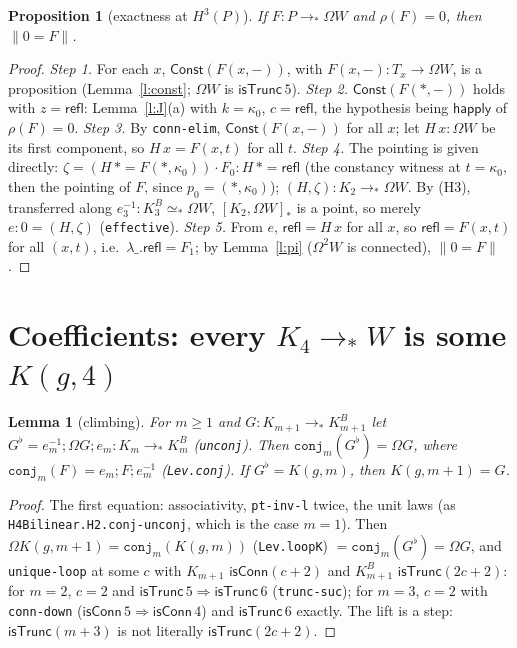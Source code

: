 \documentclass[11pt]{amsart}
\newtheorem{proposition}[theorem]{Proposition}
\newtheorem{lemma}[theorem]{Lemma}
\theoremstyle{definition}
\theoremstyle{remark}
\newcommand{\Om}{\Omega}
\newcommand{\code}[1]{\texttt{#1}}
\newcommand{\cT}{\mathsf{isTrunc}}
\newcommand{\cC}{\mathsf{isConn}}
\newcommand{\refl}{\mathsf{refl}}
\newcommand{\hc}[2]{[#1,#2]_*}
\newcommand{\Const}{\mathsf{Const}}
\newcommand{\tr}[1]{\|#1\|}
\begin{document}
\begin{proposition}[exactness at $H^3(P)$]\label{p:exact}
If $F:P\to_*\Om W$ and $\rho(F)=0$, then $\tr{0=F}$.
\end{proposition}
\begin{proof}
\emph{Step 1.} For each $x$, $\Const(F(x,-))$, with $F(x,-):T_x\to\Om W$,
is a proposition (Lemma~\ref{l:const}; $\Om W$ is $\cT\,5$).
\emph{Step 2.} $\Const(F(*,-))$ holds with $z=\refl$:
Lemma~\ref{l:J}(a) with $k=\kappa_0$, $c=\refl$, the hypothesis being
$\mathsf{happly}$ of $\rho(F)=0$.
\emph{Step 3.} By \code{conn-elim}, $\Const(F(x,-))$ for all $x$; let
$H\,x:\Om W$ be its first component, so $H\,x=F(x,t)$ for all $t$.
\emph{Step 4.} The pointing is given directly:
$\zeta=(H\,*=F(*,\kappa_0))\cdot F_0:H\,*=\refl$ (the constancy witness at
$t=\kappa_0$, then the pointing of $F$, since $p_0=(*,\kappa_0)$);
$(H,\zeta):K_2\to_*\Om W$. By (H3), transferred along
$e_3^{-1}:K^B_3\simeq_*\Om W$, $\hc{K_2}{\Om W}$ is a point, so merely
$e:0=(H,\zeta)$ (\code{effective}).
\emph{Step 5.} From $e$, $\refl=H\,x$ for all $x$, so
$\refl=F(x,t)$ for all $(x,t)$, i.e.\ $\lambda\_.\refl=F_1$; by
Lemma~\ref{l:pi} ($\Om^2W$ is connected), $\tr{0=F}$.
\end{proof}

\section{Coefficients: every $K_4\to_*W$ is some $K(g,4)$}

\begin{lemma}[climbing]\label{l:climb}
For $m\ge1$ and $G:K_{m+1}\to_*K^B_{m+1}$ let
$G^\flat=e_m^{-1};\Om G;e_m:K_m\to_*K^B_m$ (\code{unconj}). Then
$\code{conj}_m(G^\flat)=\Om G$, where $\code{conj}_m(F)=e_m;F;e_m^{-1}$
(\code{Lev.conj}). If $G^\flat=K(g,m)$, then $K(g,m+1)=G$.
\end{lemma}
\begin{proof}
The first equation: associativity, \code{pt-inv-l} twice, the unit
laws (as \code{H4Bilinear.H2.conj-unconj}, which is the case $m=1$). Then
$\Om K(g,m+1)=\code{conj}_m(K(g,m))$ (\code{Lev.loopK})
$=\code{conj}_m(G^\flat)=\Om G$, and \code{unique-loop} at some $c$ with
$K_{m+1}$ $\cC(c+2)$ and $K^B_{m+1}$ $\cT(2c+2)$: for $m=2$, $c=2$ and
$\cT\,5\Rightarrow\cT\,6$ (\code{trunc-suc}); for $m=3$, $c=2$ with
\code{conn-down} ($\cC\,5\Rightarrow\cC\,4$) and $\cT\,6$ exactly. The
lift is a step: $\cT(m+3)$ is not literally $\cT(2c+2)$.
\end{proof}
\end{document}
